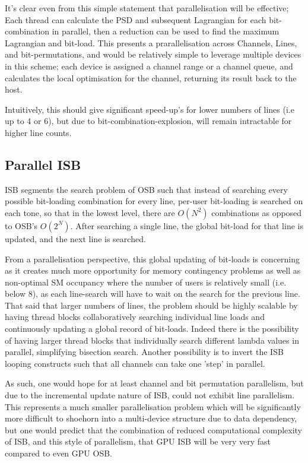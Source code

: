 It's clear even from this simple statement that parallelisation will be effective; Each thread can calculate the PSD and subsequent Lagrangian for each bit-combination in parallel, then a reduction can be used to find the maximum Lagrangian and bit-load. This presents a prarallelisation across Channels, Lines, and bit-permutations, and would be relatively simple to leverage multiple devices in this scheme; each device is assigned a channel range or a channel queue, and calculates the local optimisation for the channel, returning its result back to the host.

Intuitively, this should give significant speed-up's for lower numbers of lines (i.e up to 4 or 6), but due to bit-combination-explosion, will remain intractable for higher line counts.

\subsection{Parallel ISB}
ISB segments the search problem of OSB such that instead of searching every possible bit-loading combination for every line, per-user bit-loading is searched on each tone, so that in the lowest level, there are \(O(N^2)\) combinations as opposed to OSB's \(O(2^N)\). After searching a single line, the global bit-load for that line is updated, and the next line is searched. 

From a parallelisation perspective, this global updating of bit-loads is concerning as it creates much more opportunity for memory contingency problems as well as non-optimal SM occupancy where the number of users is relatively small (i.e. below 8), as each line-search will have to wait on the search for the previous line. That said that larger numbers of lines, the problem should be highly scalable by having thread blocks collaboratively searching individual line loads and continuously updating a global record of bit-loads. Indeed there is the possibility of having larger thread blocks that individually search different lambda values in parallel, simplifying bisection search. Another possibility is to invert the ISB looping constructs such that all channels can take one 'step' in parallel.

As such, one would hope for at least channel and bit permutation parallelism, but due to the incremental update nature of ISB, could not exhibit line parallelism. This represents a much smaller parallelisation problem which will be significantly more difficult to shoehorn into a multi-device structure due to data dependency, but one would predict that the combination of reduced computational complexity of ISB, and this style of parallelism, that GPU ISB will be very very fast compared to even GPU OSB.

